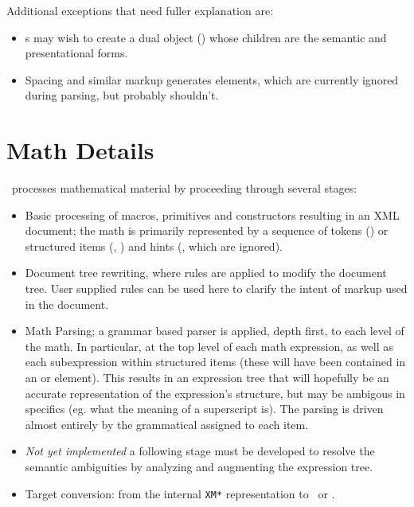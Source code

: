 \documentclass{book}
\begin{document}
Additional exceptions that need fuller explanation are: 
\begin{itemize}
 \item {}s may wish to create a dual object () whose children are 
the semantic and presentational forms.
 \item Spacing and similar markup generates  elements, which are currently ignored
during parsing, but probably shouldn't.
\end{itemize}

\section{Math Details}\label{math.details}
\LaTeXML\ processes mathematical material by proceeding through several stages:
\begin{itemize}
\item Basic processing of macros, primitives and constructors resulting in
   an XML document; the math is primarily represented by a sequence of
   tokens () or structured items (, ) and
   hints (, which are ignored).
\item Document tree rewriting, where rules are applied to modify the document tree.
   User supplied rules can be used here to clarify the intent of markup used in the document.
\item Math Parsing; a grammar based parser is applied, depth first, to each level of the math.
   In particular, at the top level of each math expression, as well as each
   subexpression within structured items (these will have been contained in
   an  or  element).  This results in an expression tree
   that will hopefully be an accurate representation of the expression's structure,
   but may be ambigous in specifics (eg. what the meaning of a superscript is).
   The parsing is driven almost entirely by the grammatical  assigned
   to each item.
\item \emph{Not yet implemented} a following stage must be developed to resolve
   the semantic ambiguities by analyzing and augmenting the expression tree.
\item Target conversion: from the internal \texttt{XM*} representation to
   \MathML\ or \OpenMath.
\end{itemize}
\end{document}
